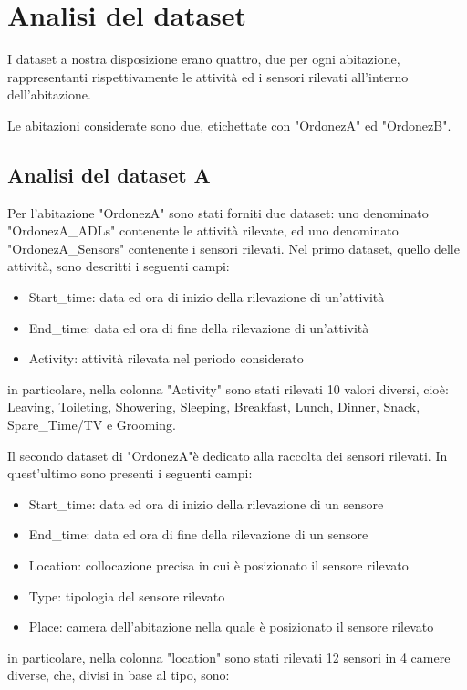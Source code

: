 \documentclass[10pt,a4paper]{article}
\begin{document}
	\clearpage
	\section{Analisi del dataset}
	I dataset a nostra disposizione erano quattro, due per ogni abitazione, rappresentanti rispettivamente le attività ed i sensori rilevati all'interno dell'abitazione.

	Le abitazioni considerate sono due, etichettate con "OrdonezA" ed "OrdonezB".
	\subsection{Analisi del dataset A}
	Per l'abitazione "OrdonezA" sono stati forniti due dataset: uno denominato "OrdonezA\_ADLs" contenente le attività rilevate, ed uno denominato "OrdonezA\_Sensors" contenente i sensori rilevati.
	Nel primo dataset, quello delle attività, sono descritti i seguenti campi:
	\begin{itemize}
		\item Start\_time: data ed ora di inizio della rilevazione di un'attività
		\item End\_time: data ed ora di fine della rilevazione di un'attività
		\item  Activity: attività rilevata nel periodo considerato
	\end{itemize}

	in particolare, nella colonna "Activity" sono stati rilevati 10 valori diversi, cioè: Leaving, Toileting, Showering, Sleeping, Breakfast, Lunch, Dinner, Snack, Spare\_Time/TV e Grooming.

	Il secondo dataset di "OrdonezA"è dedicato alla raccolta dei sensori rilevati. In quest'ultimo sono presenti i seguenti campi:
	\begin{itemize}
		\item Start\_time: data ed ora di inizio della rilevazione di un sensore
		\item End\_time: data ed ora di fine della rilevazione di un sensore
		\item  Location: collocazione precisa in cui è posizionato il sensore rilevato
		\item Type: tipologia del sensore rilevato
		\item Place: camera dell'abitazione nella quale è posizionato il sensore rilevato
	\end{itemize}

	in particolare, nella colonna "location" sono stati rilevati 12 sensori in 4 camere diverse, che, divisi in base al tipo, sono:
\end{document}
